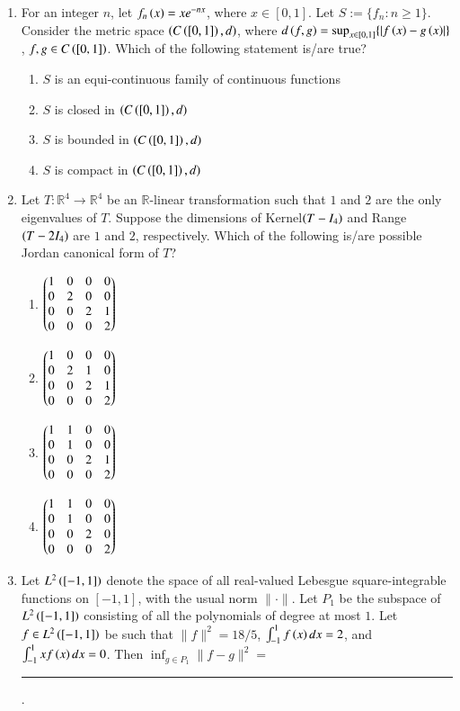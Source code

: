 \documentclass[journal,12pt,onecolumn]{IEEEtran}
\theoremstyle{remark}
\begin{document}
\begin{enumerate}
\item For an integer $n$, let $f_n\left(x\right) = xe^{-nx}$, where $x \in [0, 1]$. Let $S := \{f_n \colon n \ge 1\}$. Consider the metric space $\left(C\left([0, 1]\right), d\right)$, where $d\left(f, g\right) = \sup_{x \in [0, 1]} \{\left\vert f\left(x\right) - g\left(x\right)\right\vert\}$, $f, g \in C\left([0, 1]\right)$. Which of the following statement is/are true? \hfill{}
\begin{enumerate}
    \item $S$ is an equi-continuous family of continuous functions
    \item $S$ is closed in $\left(C\left([0, 1]\right), d\right)$
    \item $S$ is bounded in $\left(C\left([0, 1]\right), d\right)$
    \item $S$ is compact in $\left(C\left([0, 1]\right), d\right)$
\end{enumerate}

\item Let $T \colon \mathbb{R}^4 \to \mathbb{R}^4$ be an $\mathbb{R}$-linear transformation such that $1$ and $2$ are the only eigenvalues of $T$. Suppose the dimensions of Kernel$\left(T - I_4\right)$ and Range$\left(T - 2I_4\right)$ are $1$ and $2$, respectively. Which of the following is/are possible  Jordan canonical form of $T$? \hfill{}
\begin{enumerate}
    \item $\begin{pmatrix}1 & 0 & 0 & 0 \\ 0 & 2 & 0 & 0 \\ 0 & 0 & 2 & 1 \\ 0 & 0 & 0 & 2\end{pmatrix}$
    \item $\begin{pmatrix}1 & 0 & 0 & 0 \\ 0 & 2 & 1 & 0 \\ 0 & 0 & 2 & 1 \\ 0 & 0 & 0 & 2\end{pmatrix}$
    \item $\begin{pmatrix}1 & 1 & 0 & 0 \\ 0 & 1 & 0 & 0 \\ 0 & 0 & 2 & 1 \\ 0 & 0 & 0 & 2\end{pmatrix}$
    \item $\begin{pmatrix}1 & 1 & 0 & 0 \\ 0 & 1 & 0 & 0 \\ 0 & 0 & 2 & 0 \\ 0 & 0 & 0 & 2\end{pmatrix}$
\end{enumerate}

\item Let $L^2\left([-1, 1]\right)$ denote the space of all real-valued Lebesgue square-integrable functions on $[-1, 1]$, with the usual norm $\|\cdot\|$. Let $P_1$ be the subspace of $L^2\left([-1, 1]\right)$ consisting of all the polynomials of degree at most $1$. Let $f \in L^2\left([-1, 1]\right)$ be such that $\|f\|^2 = 18/5$, $\int_{-1}^1 f\left(x\right) dx = 2$, and $\int_{-1}^1 xf\left(x\right) dx = 0$. Then $\inf_{g \in P_1} \|f-g\|^2 =$ \rule{3cm}{0.15mm} . \hfill{}


\end{enumerate}
\end{document}
